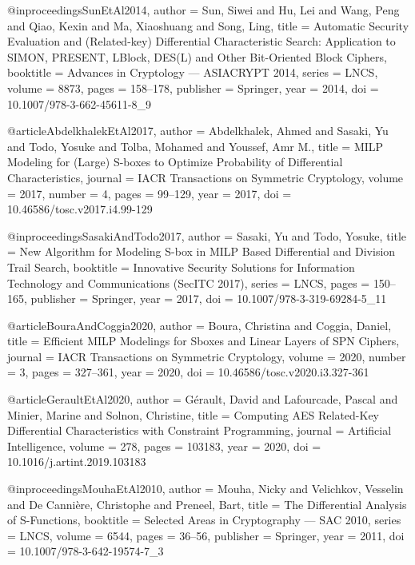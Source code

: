 @inproceedings{SunEtAl2014,
  author    = {Sun, Siwei and Hu, Lei and Wang, Peng and Qiao, Kexin and Ma, Xiaoshuang and Song, Ling},
  title     = {Automatic Security Evaluation and (Related-key) Differential Characteristic Search:
               Application to {SIMON}, {PRESENT}, {LBlock}, {DES(L)} and Other Bit-Oriented Block Ciphers},
  booktitle = {Advances in Cryptology --- ASIACRYPT 2014},
  series    = {LNCS},
  volume    = {8873}, %
  pages     = {158--178},
  publisher = {Springer},
  year      = {2014},
  doi       = {10.1007/978-3-662-45611-8_9}
}

@article{AbdelkhalekEtAl2017,
  author  = {Abdelkhalek, Ahmed and Sasaki, Yu and Todo, Yosuke and Tolba, Mohamed and Youssef, Amr M.},
  title   = {{MILP} Modeling for (Large) S-boxes to Optimize Probability of Differential Characteristics},
  journal = {IACR Transactions on Symmetric Cryptology},
  volume  = {2017},
  number  = {4},
  pages   = {99--129},
  year    = {2017},
  doi     = {10.46586/tosc.v2017.i4.99-129}
}

@inproceedings{SasakiAndTodo2017,
  author    = {Sasaki, Yu and Todo, Yosuke},
  title     = {New Algorithm for Modeling S-box in {MILP} Based Differential and Division Trail Search},
  booktitle = {Innovative Security Solutions for Information Technology and Communications (SecITC 2017)},
  series    = {LNCS},
  pages     = {150--165},
  publisher = {Springer},
  year      = {2017},
  doi       = {10.1007/978-3-319-69284-5_11}
}

@article{BouraAndCoggia2020,
  author  = {Boura, Christina and Coggia, Daniel},
  title   = {Efficient {MILP} Modelings for Sboxes and Linear Layers of {SPN} Ciphers},
  journal = {IACR Transactions on Symmetric Cryptology},
  volume  = {2020},
  number  = {3},
  pages   = {327--361},
  year    = {2020},
  doi     = {10.46586/tosc.v2020.i3.327-361}
}

@article{GeraultEtAl2020,
  author  = {G{\'e}rault, David and Lafourcade, Pascal and Minier, Marine and Solnon, Christine},
  title   = {Computing {AES} Related-Key Differential Characteristics with Constraint Programming},
  journal = {Artificial Intelligence},
  volume  = {278},
  pages   = {103183},
  year    = {2020},
  doi     = {10.1016/j.artint.2019.103183}
}

@inproceedings{MouhaEtAl2010,
  author    = {Mouha, Nicky and Velichkov, Vesselin and De Canni{\`e}re, Christophe and Preneel, Bart},
  title     = {The Differential Analysis of S-Functions},
  booktitle = {Selected Areas in Cryptography --- SAC 2010},
  series    = {LNCS},
  volume    = {6544}, %
  pages     = {36--56},
  publisher = {Springer},
  year      = {2011},
  doi       = {10.1007/978-3-642-19574-7_3}
}

